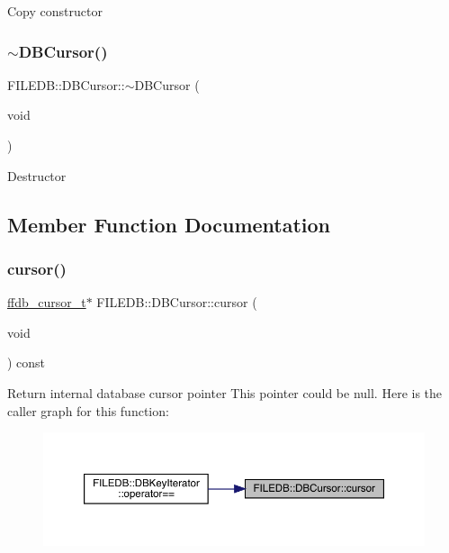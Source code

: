 Copy constructor \mbox{\label{classFILEDB_1_1DBCursor_a8c6c1bdf4c4279ab3e0d980e800c3542}} 
\subsubsection{\texorpdfstring{$\sim$DBCursor()}{~DBCursor()}\hspace{0.1cm}{\footnotesize\ttfamily [2/2]}}
{\footnotesize\ttfamily F\+I\+L\+E\+D\+B\+::\+D\+B\+Cursor\+::$\sim$\+D\+B\+Cursor (\begin{DoxyParamCaption}\item[{void}]{ }\end{DoxyParamCaption})}

Destructor 

\subsection{Member Function Documentation}
\mbox{\label{classFILEDB_1_1DBCursor_a9e5b4a386c6f27bc1eb67714117e1e6d}} 
\subsubsection{\texorpdfstring{cursor()}{cursor()}\hspace{0.1cm}{\footnotesize\ttfamily [1/2]}}
{\footnotesize\ttfamily \mbox{\hyperlink{other__libs_2filedb_2filehash_2ffdb__db_8h_a1383f6fb3966b0ca74206ba93b687fd9}{ffdb\+\_\+cursor\+\_\+t}}$\ast$ F\+I\+L\+E\+D\+B\+::\+D\+B\+Cursor\+::cursor (\begin{DoxyParamCaption}\item[{void}]{ }\end{DoxyParamCaption}) const\hspace{0.3cm}{\ttfamily [inline]}}

Return internal database cursor pointer This pointer could be null. Here is the caller graph for this function\+:\nopagebreak
\begin{figure}[H]
\begin{center}
\leavevmode
\includegraphics[width=350pt]{d2/d46/classFILEDB_1_1DBCursor_a9e5b4a386c6f27bc1eb67714117e1e6d_icgraph}
\end{center}
\end{figure}
\mbox{\label{classFILEDB_1_1DBCursor_a9e5b4a386c6f27bc1eb67714117e1e6d}} 
